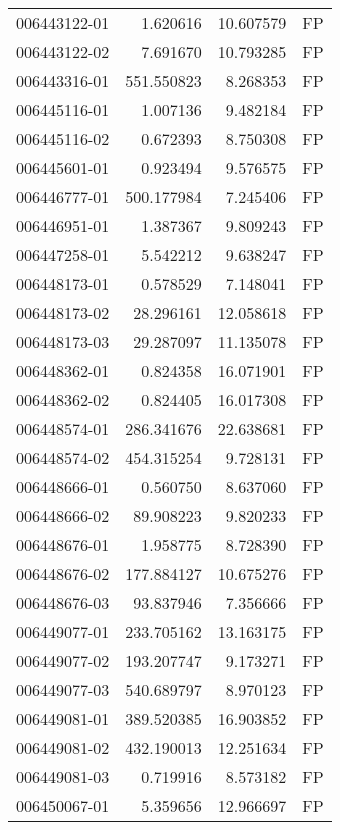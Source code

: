 \begin{tabular}{lrrl}
006443122-01 &    1.620616 &      10.607579 &   FP \\
006443122-02 &    7.691670 &      10.793285 &   FP \\
006443316-01 &  551.550823 &       8.268353 &   FP \\
006445116-01 &    1.007136 &       9.482184 &   FP \\
006445116-02 &    0.672393 &       8.750308 &   FP \\
006445601-01 &    0.923494 &       9.576575 &   FP \\
006446777-01 &  500.177984 &       7.245406 &   FP \\
006446951-01 &    1.387367 &       9.809243 &   FP \\
006447258-01 &    5.542212 &       9.638247 &   FP \\
006448173-01 &    0.578529 &       7.148041 &   FP \\
006448173-02 &   28.296161 &      12.058618 &   FP \\
006448173-03 &   29.287097 &      11.135078 &   FP \\
006448362-01 &    0.824358 &      16.071901 &   FP \\
006448362-02 &    0.824405 &      16.017308 &   FP \\
006448574-01 &  286.341676 &      22.638681 &   FP \\
006448574-02 &  454.315254 &       9.728131 &   FP \\
006448666-01 &    0.560750 &       8.637060 &   FP \\
006448666-02 &   89.908223 &       9.820233 &   FP \\
006448676-01 &    1.958775 &       8.728390 &   FP \\
006448676-02 &  177.884127 &      10.675276 &   FP \\
006448676-03 &   93.837946 &       7.356666 &   FP \\
006449077-01 &  233.705162 &      13.163175 &   FP \\
006449077-02 &  193.207747 &       9.173271 &   FP \\
006449077-03 &  540.689797 &       8.970123 &   FP \\
006449081-01 &  389.520385 &      16.903852 &   FP \\
006449081-02 &  432.190013 &      12.251634 &   FP \\
006449081-03 &    0.719916 &       8.573182 &   FP \\
006450067-01 &    5.359656 &      12.966697 &   FP \\

\end{tabular}
